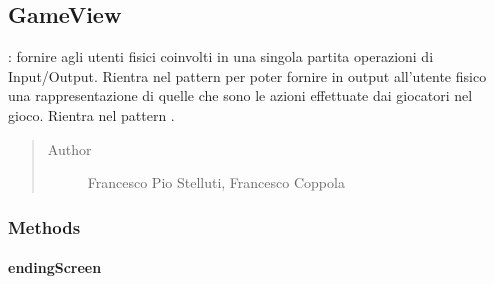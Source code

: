\documentclass[letterpaper,10pt,italian,openany,oneside]{sphinxmanual}
\begin{document}
\subsection{GameView}
\label{\detokenize{test/it/unicam/cs/pa/mastermind/ui/GameView:gameview}}\label{\detokenize{test/it/unicam/cs/pa/mastermind/ui/GameView::doc}}

\begin{fulllineitems}
\label{\detokenize{test/it/unicam/cs/pa/mastermind/ui/GameView:it.unicam.cs.pa.mastermind.ui.GameView}}
: fornire agli utenti fisici coinvolti in una singola partita operazioni di Input/Output. Rientra nel pattern  per poter fornire in output all’utente fisico una rappresentazione di quelle che sono le azioni effettuate dai giocatori nel gioco. Rientra nel pattern .
\begin{quote}\begin{description}
\item[{Author}] \leavevmode
Francesco Pio Stelluti, Francesco Coppola

\end{description}\end{quote}

\end{fulllineitems}



\subsubsection{Methods}
\label{\detokenize{test/it/unicam/cs/pa/mastermind/ui/GameView:methods}}

\paragraph{endingScreen}
\label{\detokenize{test/it/unicam/cs/pa/mastermind/ui/GameView:endingscreen}}
\end{document}
